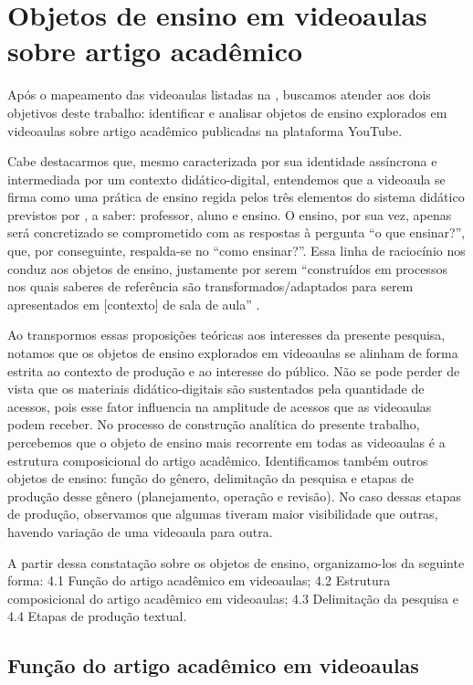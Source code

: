 \section{Objetos de ensino em videoaulas sobre artigo acadêmico}\label{sec-objetos}

Após o mapeamento das videoaulas listadas na , buscamos atender
aos dois objetivos deste trabalho: identificar e analisar objetos de
ensino explorados em videoaulas sobre artigo acadêmico publicadas na
plataforma YouTube.

Cabe destacarmos que, mesmo caracterizada por sua identidade assíncrona
e intermediada por um contexto didático-digital, entendemos que a
videoaula se firma como uma prática de ensino regida pelos três
elementos do sistema didático previstos por \textcite{linodearaujo2014}, a
saber: professor, aluno e ensino. O ensino, por sua vez, apenas será
concretizado se comprometido com as respostas à pergunta ``o que
ensinar?'', que, por conseguinte, respalda-se no ``como ensinar?''. Essa
linha de raciocínio nos conduz aos objetos de ensino, justamente por
serem ``construídos em processos nos quais saberes de referência são
transformados/adaptados para serem apresentados em {[}contexto{]} de
sala de aula'' \cite[p.~6]{linodearaujo2014}.

Ao transpormos essas proposições teóricas aos interesses da presente
pesquisa, notamos que os objetos de ensino explorados em videoaulas se
alinham de forma estrita ao contexto de produção e ao interesse do
público. Não se pode perder de vista que os materiais didático-digitais
são sustentados pela quantidade de acessos, pois esse fator influencia
na amplitude de acessos que as videoaulas podem receber. No processo de
construção analítica do presente trabalho, percebemos que o objeto de
ensino mais recorrente em todas as videoaulas é a estrutura
composicional do artigo acadêmico. Identificamos também outros objetos
de ensino: função do gênero, delimitação da pesquisa e etapas de
produção desse gênero (planejamento, operação e revisão). No caso dessas
etapas de produção, observamos que algumas tiveram maior visibilidade
que outras, havendo variação de uma videoaula para outra.

A partir dessa constatação sobre os objetos de ensino, organizamo-los da
seguinte forma: 4.1 Função do artigo acadêmico em videoaulas; 4.2
Estrutura composicional do artigo acadêmico em videoaulas; 4.3
Delimitação da pesquisa e 4.4 Etapas de produção textual.

\subsection{Função do artigo acadêmico em videoaulas}\label{sub-sec-funçãodoartigo}

